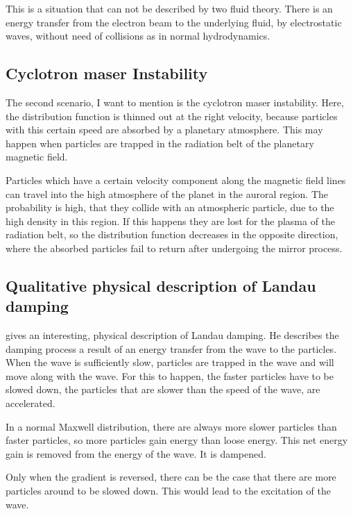 \documentclass[a4paper,10pt]{report}
\begin{document}
This is a situation that can not be described by two fluid theory. There is an energy transfer from the electron beam to the underlying fluid, by electrostatic waves, without need of collisions as in normal hydrodynamics.

\subsection{Cyclotron maser Instability}
The second scenario, I want to mention is the cyclotron maser instability. Here, the distribution function is thinned out at the right velocity, because particles with this certain speed are absorbed by a planetary atmosphere. This may happen when particles are trapped in the radiation belt of the planetary magnetic field.

Particles which have a certain velocity component along the magnetic field lines can travel into the high atmosphere of the planet in the auroral region. The probability is high, that they collide with an atmospheric particle, due to the high density in this region. If this happens they are lost for the plasma of the radiation belt, so the distribution function decreases in the opposite direction, where the absorbed particles fail to return after undergoing the mirror process.

\subsection{Qualitative physical description of Landau damping}
\cite{jackson} gives an interesting, physical description of Landau damping. He describes the damping process a result of an energy transfer from the wave to the particles. When the wave is sufficiently slow, particles are trapped in the wave and will move along with the wave. For this to happen, the faster particles have to be slowed down, the particles that are slower than the speed of the wave, are accelerated.

In a normal Maxwell distribution, there are always more slower particles than faster particles, so more particles gain energy than loose energy. This net energy gain is removed from the energy of the wave. It is dampened.

Only when the gradient is reversed, there can be the case that there are more particles around to be slowed down. This would lead to the excitation of the wave.



\end{document}
